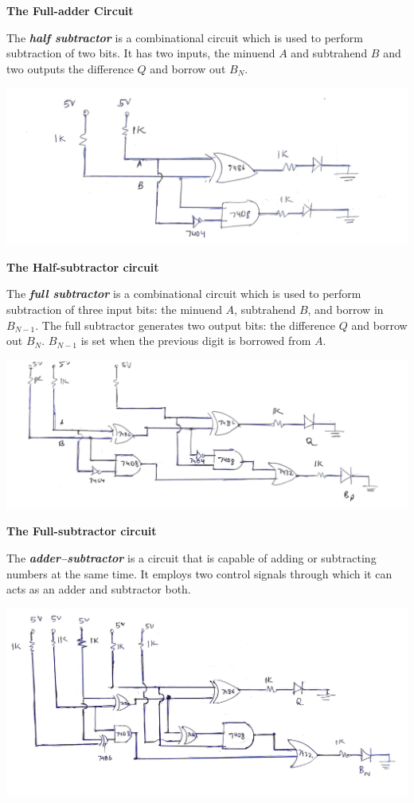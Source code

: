 \begin{center}
    \textbf{The Full-adder Circuit}
\end{center}
The \textbf{\emph{half subtractor}} is a combinational circuit which is used to perform subtraction of two bits. It has two inputs, the minuend $A$ and subtrahend $B$ and two outputs the difference $Q$ and borrow out $B_{N}$.
\begin{center}
    \includegraphics[scale = 0.2]{halfsubtractor_1.jpg}
\end{center}
\begin{center}
    \textbf{The Half-subtractor circuit}
\end{center}
The \textbf{\emph{full subtractor}} is a combinational circuit which is used to perform subtraction of three input bits: the minuend $A$, subtrahend $B$, and borrow in $B_{N-1}$. The full subtractor generates two output bits: the difference $Q$ and borrow out $B_{N}$. $B_{N-1}$ is set when the previous digit is borrowed from $A$.
\begin{center}
    \includegraphics[scale = 0.2]{fullsubtractor_1.jpg}
\end{center}
\begin{center}
    \textbf{The Full-subtractor circuit}
\end{center}
The \textbf{\emph{adder–subtractor}} is a circuit that is capable of adding or subtracting numbers at the same time. It employs two control signals through which it can acts as an adder and subtractor both.
\begin{center}
    \includegraphics[scale = 0.2]{1615830083100.jpg}
\end{center}
